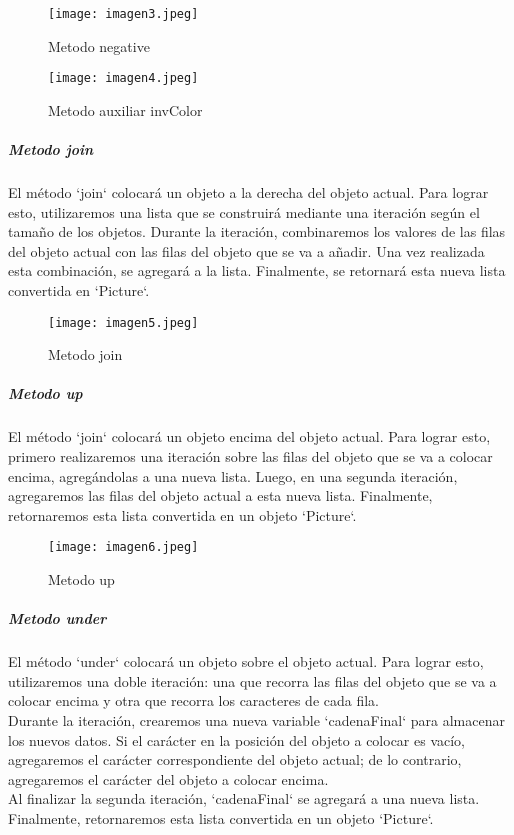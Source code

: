 \documentclass[10pt, a4paper]{article}
\begin{document}
		\begin{figure}[h]
			\centering
			\texttt{[image: imagen3.jpeg]}
			\caption{Metodo negative}
		\end{figure}
		\begin{figure}[h]
			\centering
			\texttt{[image: imagen4.jpeg]}
			\caption{Metodo auxiliar invColor}
		\end{figure}
	\subparagraph*{Metodo join}
		\begin{flushleft}
			El método `join` colocará un objeto a la derecha del objeto actual. Para lograr esto, utilizaremos una lista que se construirá mediante una iteración según el tamaño de los objetos. Durante la iteración, combinaremos los valores de las filas del objeto actual con las filas del objeto que se va a añadir. Una vez realizada esta combinación, se agregará a la lista. Finalmente, se retornará esta nueva lista convertida en `Picture`.
		\end{flushleft}
		\begin{figure}[h]
			\centering
			\texttt{[image: imagen5.jpeg]}
			\caption{Metodo join}
		\end{figure}
		\vspace*{4cm}
	\subparagraph*{Metodo up}
		\begin{flushleft}
			El método `join` colocará un objeto encima del objeto actual. Para lograr esto, primero realizaremos una iteración sobre las filas del objeto que se va a colocar encima, agregándolas a una nueva lista. Luego, en una segunda iteración, agregaremos las filas del objeto actual a esta nueva lista. Finalmente, retornaremos esta lista convertida en un objeto `Picture`.
		\end{flushleft}
		\begin{figure}[h]
			\centering
			\texttt{[image: imagen6.jpeg]}
			\caption{Metodo up}
		\end{figure}
	\subparagraph*{Metodo under}
		\begin{flushleft}
			El método `under` colocará un objeto sobre el objeto actual. Para lograr esto, utilizaremos una doble iteración: una que recorra las filas del objeto que se va a colocar encima y otra que recorra los caracteres de cada fila. \\			
			Durante la iteración, crearemos una nueva variable `cadenaFinal` para almacenar los nuevos datos. Si el carácter en la posición del objeto a colocar es vacío, agregaremos el carácter correspondiente del objeto actual; de lo contrario, agregaremos el carácter del objeto a colocar encima. \\
			Al finalizar la segunda iteración, `cadenaFinal` se agregará a una nueva lista. Finalmente, retornaremos esta lista convertida en un objeto `Picture`.
		\end{flushleft}
\end{document}
